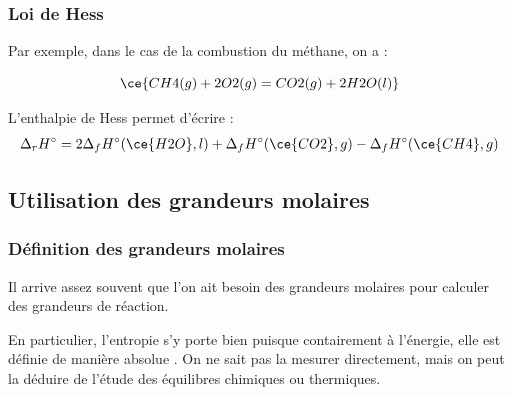 \subsubsection{Loi de Hess}


Par exemple, dans le cas de la combustion du méthane, on a :

\begin{equation*}
\ce{CH4(g) + 2 O2(g) = CO2(g) + 2 H2O(l)}
\end{equation*}

L'enthalpie de Hess permet d'écrire : 
\begin{align*}
\Delta_r H^\circ = 2 \Delta_f H^\circ (\ce{H2O}, l) + \Delta_f H^\circ (\ce{CO2}, g) - \Delta_f H^\circ (\ce{CH4}, g)
\end{align*}

\subsection{Utilisation des grandeurs molaires}
\subsubsection{Définition des grandeurs molaires}
Il arrive assez souvent que l'on ait besoin des grandeurs molaires pour calculer des grandeurs de réaction. 

En particulier, l'entropie s'y porte bien puisque contairement à l'énergie, elle est définie de manière absolue . On ne sait pas la mesurer directement, mais on peut la déduire de l'étude des équilibres chimiques ou thermiques.

